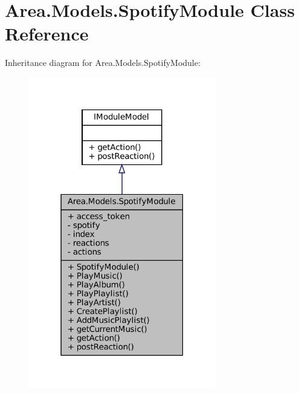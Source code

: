 \hypertarget{classArea_1_1Models_1_1SpotifyModule}{}\section{Area.\+Models.\+Spotify\+Module Class Reference}
\label{classArea_1_1Models_1_1SpotifyModule}


Inheritance diagram for Area.\+Models.\+Spotify\+Module\+:
\nopagebreak
\begin{figure}[H]
\begin{center}
\leavevmode
\includegraphics[width=231pt]{classArea_1_1Models_1_1SpotifyModule__inherit__graph}
\end{center}
\end{figure}


